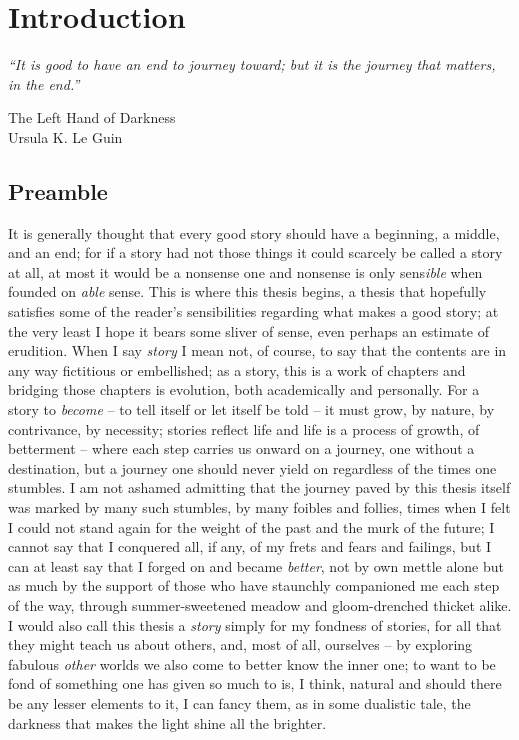 \chapter{Introduction}\label{ch:intro}
\epigraph{
    \emph{
        ``It is good to have an end to journey toward; but it is the journey that matters, in the
        end.''
} 
%
}
{The Left Hand of Darkness\\Ursula K. Le Guin}
%
\section*{Preamble}
%
\noindent 
%
It is generally thought that every good story should have a beginning, a middle, and an
end; for if a story had not those things it could scarcely be called a story at all, at most it
would be a nonsense one and nonsense is only sens\emph{ible} when founded on \emph{able} sense.
%
This is where this thesis begins, a thesis that hopefully satisfies some of the reader's
sensibilities regarding what makes a good story; at the very least I hope it bears some sliver of
sense, even perhaps an estimate of erudition.
%
%
When I say \emph{story} I mean not, of course, to say that the contents are in any way fictitious
or embellished; as a story, this is a work of chapters and bridging those chapters is evolution,
both academically and personally.
%
For a story to \emph{become} -- to tell itself or let itself be told -- it must grow, by nature, by
contrivance, by necessity; stories reflect life and life is a process of growth, of betterment --
where each step carries us onward on a journey, one without a destination, but a journey one should
never yield on regardless of the times one stumbles. 
%
I am not ashamed admitting that the journey paved by this thesis itself was marked by many such
stumbles, by many foibles and follies, times when I felt I could not stand again for the weight of
the past and the murk of the future; I cannot say that I conquered all, if any, of my frets and
fears and failings, but I can at least say that I forged on and became \emph{better}, not by own
mettle alone but as much by the support of those who have staunchly companioned me each step of the
way, through summer-sweetened meadow and gloom-drenched thicket alike.
%
I would also call this thesis a \emph{story} simply for my fondness of stories, for all that they
might teach us about others, and, most of all, ourselves -- by exploring fabulous \emph{other}
worlds we also come to better know the inner one; to want to be fond of something one has given so
much to is, I think, natural and should there be any lesser elements to it, I can fancy them, as in
some dualistic tale, the darkness that makes the light shine all the brighter. 
%
%
